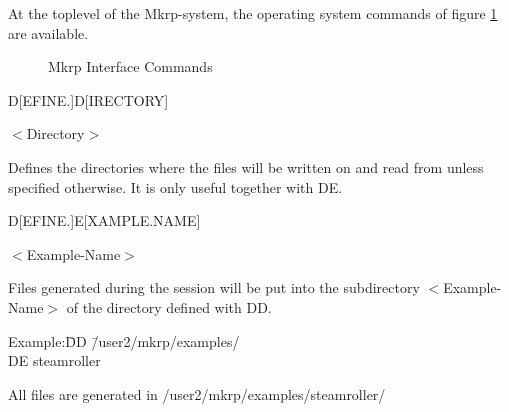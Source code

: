 At the toplevel of the {\sc Mkrp}-system, the operating system 
commands of figure \ref{MKRPInterfaceCommands} are available.
\begin{figure}[ht]
\caption{{\sc Mkrp} Interface Commands}
\label{MKRPInterfaceCommands}
\begin{center}
\end{center}
\end{figure}

\parbox[t]{4.9cm}{D[EFINE.]D[IRECTORY] 	

 
\quad $<$Directory$>$}
\hfill\parbox[t]{11cm}{
	Defines the directories where the files 
will be written on and read from unless specified otherwise. It is only useful together with DE.}

\parbox[t]{4.9cm}{D[EFINE.]E[XAMPLE.NAME]

 
\quad $<$Example-Name$>$}
\hfill\parbox[t]{11cm}{Files generated during the session will be put into the subdirectory $<$Example-Name$>$ of the directory defined with DD.

\begin{tabbing}
Example:\quad\= DD  \= /user2/mkrp/examples/\\
\>                DE  \> steamroller
\end{tabbing}

All files are generated in /user2/\-mkrp/\-examples/\-steam\-roller/} 

